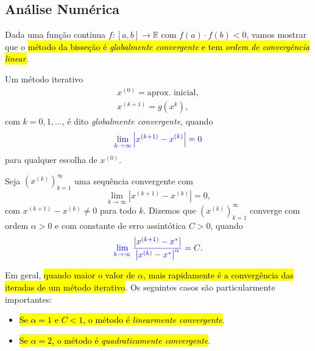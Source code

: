 \subsection{Análise Numérica}

Dada uma função contínua $f:[a, b]\to\mathbb{R}$ com $f(a)\cdot f(b) < 0$, vamos mostrar que o \hl{método da bisseção é \emph{globalmente convergente} e tem \emph{ordem de convergência linear}}.

\begin{defn}
  Um método iterativo
  \begin{gather}
    x^{(0)} = \text{aprox. inicial},\\
    x^{(k+1)} = g\left(x^{k}\right),
  \end{gather}
  com $k = 0,1,\ldots$, é dito \emph{globalmente convergente}, quando
  \begin{equation}
    {\color{blue}\lim_{k\to\infty}\left|x^{(k+1)}-x^{(k)}\right| = 0}
  \end{equation}
  para qualquer escolha de $x^{(0)}$.
\end{defn}

\begin{defn}
  Seja $\left(x^{(k)}\right)_{k=1}^\infty$ uma sequência convergente com
  \begin{equation}
    \lim_{k\to\infty} \left|x^{(k+1)}-x^{(k)}\right| = 0,
  \end{equation}
  com $x^{(k+1)}-x^{(k)}\neq 0$ para todo $k$. Dizemos que $\left(x^{(k)}\right)_{k=1}^\infty$ converge com ordem $\alpha>0$ e com constante de erro assintótica $C>0$, quando
  \begin{equation}
    {\color{blue}\lim_{k\to\infty}\frac{\left|x^{(k+1)}-x^*\right|}{\left|x^{(k)}-x^*\right|^\alpha} = C}. 
  \end{equation}
\end{defn}

Em geral, \hl{quando maior o valor de $\alpha$, mais rapidamente é a convergência das iteradas de um método iterativo}. Os seguintes casos são particularmente importantes:
\begin{itemize}
\item \hl{Se $\alpha = 1$ e $C < 1$, o método é \emph{linearmente convergente}}.
\item \hl{Se $\alpha = 2$, o método é \emph{quadraticamente convergente}}.
\end{itemize}

